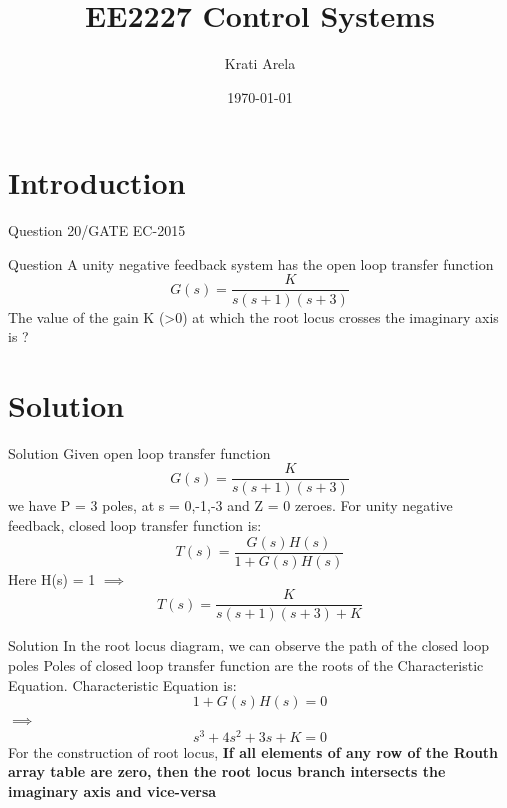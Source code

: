 \documentclass{beamer}
\title[Your Short Title]{EE2227 Control Systems}
\author{Krati Arela}
\institute{EE18BTECH11050}
\date{\today}
\begin{document}
\begin{frame}
  \titlepage
\end{frame}

\section{Introduction}

\begin{frame}{Question 20/GATE EC-2015}


\begin{block}{Question}
A unity negative feedback system has the open loop transfer function\newline
\[G(s) = \frac{K}{s(s+1)(s+3)}\]\newline
The value of the gain K (>0) at which the root locus crosses the imaginary axis is ?
\end{block}

\end{frame}

\section{Solution}

\begin{frame}{Solution}
Given open loop transfer function\newline
\[G(s) = \frac{K}{s(s+1)(s+3)}\]\newline
we have P = 3 poles, at s = 0,-1,-3 and Z = 0 zeroes.
\newline
\newline
For unity negative feedback, closed loop transfer function is:\newline
\[T(s)= \frac{G(s)H(s)}{1+G(s)H(s)}\]\newline
Here H(s) = 1\newline
$\implies$\[T(s) = \frac{K}{s(s+1)(s+3)+K}\]

\end{frame}

\begin{frame}{Solution}
In the root locus diagram, we can observe the path of the closed loop poles\newline
Poles of closed loop transfer function are the roots of the Characteristic Equation.\newline
Characteristic Equation is:
\newline
\[ 1 + G(s)H(s) = 0\]\newline
$\implies$ \[ s^3 + 4s^2 + 3s + K = 0\] \newline
For the construction of root locus,
\textbf{If all elements of any row of the Routh array table are zero, then the root locus branch intersects the imaginary axis and vice-versa}\newline
\end{frame}
\end{document}

